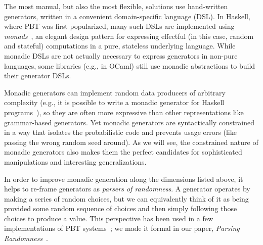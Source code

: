 The most manual, but also the most flexible, solutions use hand-written
generators, written in a convenient domain-specific language (DSL).
In  Haskell, where PBT was
first popularized, many such DSLs are implemented using {\em
monads\/}~\cite{moggi1991notions}, an elegant design pattern for
expressing effectful (in this case, random and stateful) computations
in a pure, stateless underlying
language. While monadic DSLs are not actually necessary to express generators in
non-pure languages, some libraries (e.g., in OCaml) still use monadic
abstractions to build their generator DSLs.

Monadic generators can implement random data producers of arbitrary complexity
(e.g., it is possible to write a monadic generator for Haskell
programs~\cite{palka_testing_2011}), so they are often more expressive than
other representations like grammar-based generators.  Yet monadic generators are
syntactically constrained in a way that isolates the probabilistic code and
prevents usage errors (like passing the wrong random seed around). As we will
see, the constrained nature of monadic generators also makes them the perfect
candidates for sophisticated manipulations and interesting generalizations.

In order to improve monadic generation along the dimensions listed
above, it helps to re-frame generators as {\em parsers of randomness}. A generator
operates by making a series of random choices, but we can equivalently think of
it as being provided some random sequence of choices and then simply following
those choices to produce a value. This perspective has been used in a few
implementations of PBT
systems~\cite{maciver2019hypothesis, dolan2017testing}; we made it
formal in our paper, {\em Parsing Randomness}~\cite{goldstein2022parsing}.

